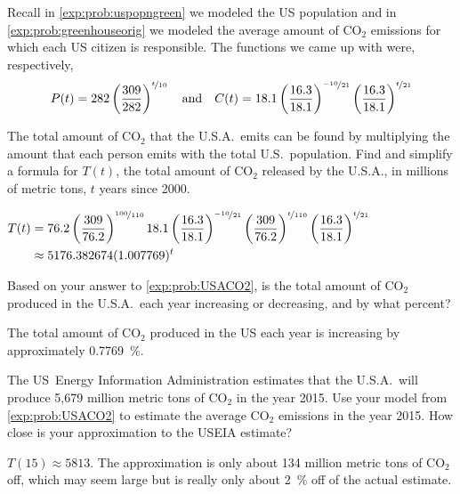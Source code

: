 \begin{problem}
Recall in \vref{exp:prob:uspopngreen} we modeled the US population and 
in \vref{exp:prob:greenhouseorig} we modeled the average amount of CO$_2$ emissions
for which each US citizen is responsible. The functions we came up with were, 
respectively,
\[
	P(t)=282\left( \frac{309}{282} \right)^{\nicefrac{t}{10}} \quad \textrm{and}\quad
	C(t)=18.1\left( \frac{16.3}{18.1} \right)^{\nicefrac{-10}{21}}\left( \frac{16.3}{18.1} \right)^{\nicefrac{t}{21}}
\]
			
\begin{subproblem}\label{exp:prob:USACO2}
	The total amount of CO$_{2}$ that the U.S.A.\ emits can be found by multiplying the amount that each person 
	emits with the total U.S.\ population. Find and simplify a formula for $T(t)$, the total amount of CO$_{2}$ 
	released by the U.S.A., in millions of metric tons, $t$ years since 2000.
	\begin{shortsolution}
		$\begin{aligned}[t]
			T(t) & =76.2\left( \frac{309}{76.2} \right)^{\nicefrac{100}{110}}18.1\left( \frac{16.3}{18.1} \right)^{\nicefrac{-10}{21}}\left( \frac{309}{76.2} \right)^{\nicefrac{t}{110}}\left( \frac{16.3}{18.1} \right)^{\nicefrac{t}{21}} \\
			     & \approx 5176.382674(1.007769)^t                                                                                                                                                                                           
		\end{aligned}$
	\end{shortsolution}
\end{subproblem}		
\begin{subproblem}
	Based on your answer to \cref{exp:prob:USACO2}, is the total amount of CO$_{2}$ produced in the U.S.A.\ each year increasing 
	or decreasing, and by what percent?
	\begin{shortsolution}
		The total amount of CO$_{2}$ produced in the US each year is increasing by approximately \SI{0.7769}{\percent}.
	\end{shortsolution}
\end{subproblem}
\begin{subproblem}
	The US\ Energy Information Administration estimates that the U.S.A.\ will produce 5,679 million metric tons 
	of CO$_{2}$ in the year 2015. Use your model from \cref{exp:prob:USACO2} to estimate the average CO$_2$ emissions in the year 2015.  How close is your approximation to the USEIA estimate?
	\begin{shortsolution}
		$T(15) \approx 5813$.  The approximation is only about 134 million metric tons of CO$_{2}$ off, which may seem large but is really only about \SI{2}{\percent} off of the actual estimate.
	\end{shortsolution}
\end{subproblem}
\end{problem}
			

